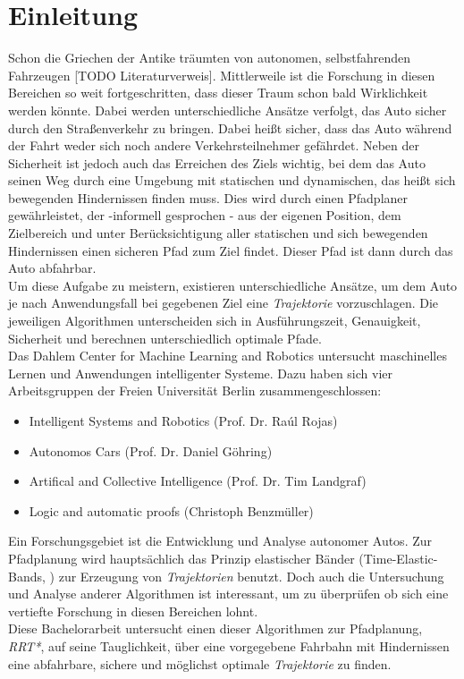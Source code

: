 \section{Einleitung}
Schon die Griechen der Antike träumten von autonomen, selbstfahrenden Fahrzeugen [TODO Literaturverweis]. Mittlerweile ist die Forschung in diesen Bereichen so weit fortgeschritten, dass dieser Traum schon bald Wirklichkeit werden könnte. Dabei werden unterschiedliche Ansätze verfolgt, das Auto sicher durch den Straßenverkehr zu bringen. Dabei heißt sicher, dass das Auto während der Fahrt weder sich noch andere Verkehrsteilnehmer gefährdet. Neben der Sicherheit ist jedoch auch das Erreichen des Ziels wichtig, bei dem das Auto seinen Weg durch eine Umgebung mit statischen und dynamischen, das heißt sich bewegenden Hindernissen finden muss. Dies wird durch einen Pfadplaner gewährleistet, der -informell gesprochen - aus der eigenen Position, dem Zielbereich und unter Berücksichtigung aller statischen und sich bewegenden Hindernissen einen sicheren Pfad zum Ziel findet. Dieser Pfad ist dann durch das Auto abfahrbar.\\
Um diese Aufgabe zu meistern, existieren unterschiedliche Ansätze, um dem Auto je nach Anwendungsfall bei gegebenen Ziel eine \textit{Trajektorie} vorzuschlagen. Die jeweiligen Algorithmen unterscheiden sich in Ausführungszeit, Genauigkeit, Sicherheit und berechnen unterschiedlich optimale Pfade.  \\
Das Dahlem Center for Machine Learning and Robotics untersucht maschinelles Lernen und Anwendungen intelligenter Systeme. Dazu haben sich vier Arbeitsgruppen der Freien Universität Berlin zusammengeschlossen:
\begin{itemize}
\item Intelligent Systems and Robotics (Prof. Dr. Raúl Rojas)
\item Autonomos Cars (Prof. Dr. Daniel Göhring)
\item Artifical and Collective Intelligence (Prof. Dr. Tim Landgraf)
\item Logic and automatic proofs (Christoph Benzmüller)
\end{itemize}
Ein Forschungsgebiet ist die Entwicklung und Analyse autonomer Autos. Zur Pfadplanung wird hauptsächlich das Prinzip elastischer Bänder (Time-Elastic-Bands, \citep[vgl.][]{RoeHoBe}) zur Erzeugung von \textit{Trajektorien} benutzt. Doch auch die Untersuchung und Analyse anderer Algorithmen ist interessant, um zu überprüfen ob sich eine vertiefte Forschung in diesen Bereichen lohnt. \\ 
Diese Bachelorarbeit untersucht einen dieser Algorithmen zur Pfadplanung, \textit{RRT*}, auf seine Tauglichkeit, über eine vorgegebene Fahrbahn mit Hindernissen eine abfahrbare, sichere und möglichst optimale \textit{Trajektorie} zu finden. 

